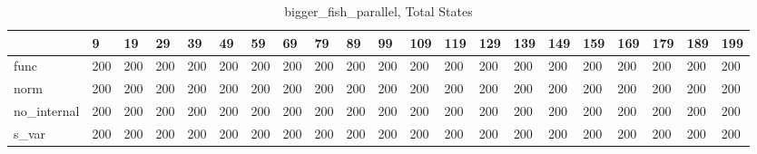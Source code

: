 \begin{table}
\caption{bigger_fish_parallel, Total States}
\label{bigger_fish_parallel_total}
\begin{tabular}{lllllllllllllllllllll}
\toprule
 & 9 & 19 & 29 & 39 & 49 & 59 & 69 & 79 & 89 & 99 & 109 & 119 & 129 & 139 & 149 & 159 & 169 & 179 & 189 & 199 \\
\midrule
func & 200 & 200 & 200 & 200 & 200 & 200 & 200 & 200 & 200 & 200 & 200 & 200 & 200 & 200 & 200 & 200 & 200 & 200 & 200 & 200 \\
norm & 200 & 200 & 200 & 200 & 200 & 200 & 200 & 200 & 200 & 200 & 200 & 200 & 200 & 200 & 200 & 200 & 200 & 200 & 200 & 200 \\
no_internal & 200 & 200 & 200 & 200 & 200 & 200 & 200 & 200 & 200 & 200 & 200 & 200 & 200 & 200 & 200 & 200 & 200 & 200 & 200 & 200 \\
s_var & 200 & 200 & 200 & 200 & 200 & 200 & 200 & 200 & 200 & 200 & 200 & 200 & 200 & 200 & 200 & 200 & 200 & 200 & 200 & 200 \\
\bottomrule
\end{tabular}
\end{table}

